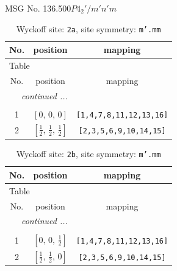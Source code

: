 \documentclass[fleqn,8pt]{jsarticle}
\begin{document}
\setcounter{MaxMatrixCols}{32}

\renewcommand{\tablename}{Table~}
\renewcommand{\figurename}{Figure~}
\begin{center}
\LARGE
MSG No. 136.500\quad$P4_{2}'/m'n'm$
\end{center}
\renewcommand{\arraystretch}{1.2}
\begin{longtable}{ccc}
\caption{Wyckoff site: {\tt 2a}, site symmetry: {\tt m'.mm}}
 \\
 \hline \hline
No. & position & mapping \\ \hline \endfirsthead

\multicolumn{2}{l}{\tablename\ \thetable{}} \\
 \hline \hline
No. & position & mapping \\ \hline \endhead

 \hline \hline
\multicolumn{2}{r}{\footnotesize\it continued ...} \\ \endfoot

 \hline \hline
\multicolumn{2}{r}{} \\ \endlastfoot

1 & $\left[ 0,\, 0,\, 0 \right]$ & {\tt [1,4,7,8,11,12,13,16]} \\ \hline
2 & $\left[ \frac{1}{2},\, \frac{1}{2},\, \frac{1}{2} \right]$ & {\tt [2,3,5,6,9,10,14,15]} \\
\end{longtable}
\renewcommand{\arraystretch}{1.2}
\begin{longtable}{ccc}
\caption{Wyckoff site: {\tt 2b}, site symmetry: {\tt m'.mm}}
 \\
 \hline \hline
No. & position & mapping \\ \hline \endfirsthead

\multicolumn{2}{l}{\tablename\ \thetable{}} \\
 \hline \hline
No. & position & mapping \\ \hline \endhead

 \hline \hline
\multicolumn{2}{r}{\footnotesize\it continued ...} \\ \endfoot

 \hline \hline
\multicolumn{2}{r}{} \\ \endlastfoot

1 & $\left[ 0,\, 0,\, \frac{1}{2} \right]$ & {\tt [1,4,7,8,11,12,13,16]} \\ \hline
2 & $\left[ \frac{1}{2},\, \frac{1}{2},\, 0 \right]$ & {\tt [2,3,5,6,9,10,14,15]} \\
\end{longtable}
\end{document}
